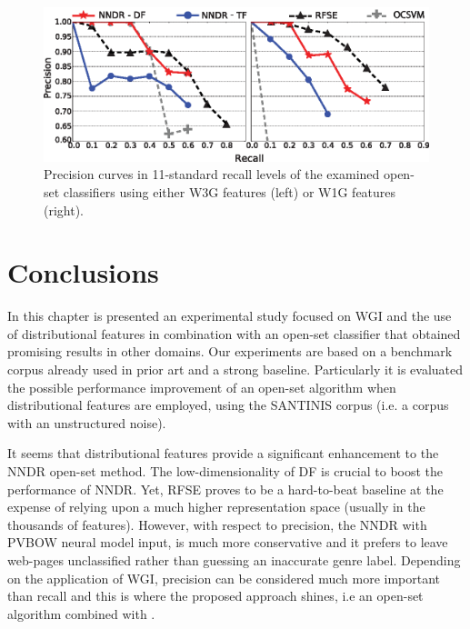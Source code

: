 \begin{figure}[t]
\begin{center}
    \includegraphics[scale=0.95]{Figures/NNDR_W3G-W1G_Best_RFSE-OCSVM-Baselines.eps}
	\caption{Precision curves in 11-standard recall levels of the examined open-set classifiers using either W3G features (left) or W1G features (right).}
	\label{chap:word_embeddings:fig:NNDR_W3G_Best_RFSE_Baseline}
	\end{center}
\end{figure}


\section{Conclusions}\label{chap:word_embeddings:sec:conclusions}

In this chapter is presented an experimental study focused on WGI and the use of distributional features in combination with an open-set classifier that obtained promising results in other domains. Our experiments are based on a benchmark corpus already used in prior art and a strong baseline. Particularly it is evaluated the possible performance improvement of an open-set algorithm when distributional features are employed, using the SANTINIS corpus (i.e. a corpus with an unstructured noise).

It seems that distributional features provide a significant enhancement to the NNDR open-set method. The low-dimensionality of DF is crucial to boost the performance of NNDR. Yet, RFSE proves to be a hard-to-beat baseline at the expense of relying upon a much higher representation space (usually in the thousands of features). However, with respect to precision, the NNDR with PVBOW neural model input, is much more conservative and it prefers to leave web-pages unclassified rather than guessing an inaccurate genre label. Depending on the application of WGI, precision can be considered much more important than recall and this is where the proposed approach shines, i.e an open-set algorithm combined with .

